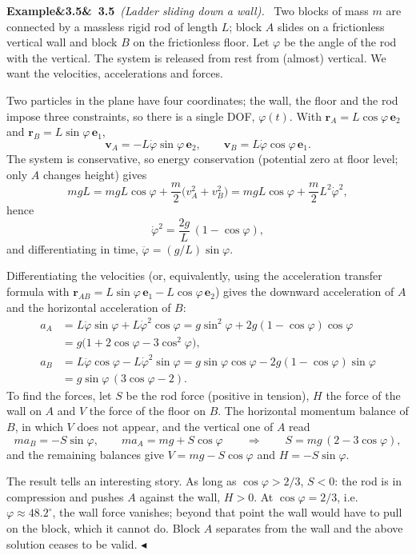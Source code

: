 \documentclass[11pt,a4paper,oneside]{report}
\numberwithin{equation}{chapter}
\newcommand{\vect}[1]{\bm{#1}}
\newcommand{\e}[1]{\vect{e}_{#1}}
\theoremstyle{plain}
\theoremstyle{definition}
\theoremstyle{remark}
\newenvironment{example}[2]{%
  \par\addvspace{\bigskipamount}\noindent
  \textbf{Example\ifx&#1&\else~#1\fi}\ \textit{(#2).}\ \ignorespaces}%
  {\hfill$\blacktriangleleft$\par\addvspace{\bigskipamount}}
\newcommand{\lecture}[2]{\marginpar{\raggedright\footnotesize\textsc{Lecture #1}\\\textit{#2}}}
\begin{document}
\lecture{9}{14.10.2026}
\begin{example}{3.5}{Ladder sliding down a wall}
Two blocks of mass $m$ are connected by a massless rigid rod of length $L$; block $A$ slides on a frictionless
vertical wall and block $B$ on the frictionless floor. Let $\varphi$ be the angle of the rod with the vertical. The system
is released from rest from (almost) vertical. We want the velocities, accelerations and forces.

Two particles in the plane have four coordinates; the wall, the floor and the rod impose three constraints, so there
is a single DOF, $\varphi(t)$. With $\vect r_A=L\cos\varphi\,\e2$ and $\vect r_B=L\sin\varphi\,\e1$,
\[
  \vect v_A=-L\dot\varphi\sin\varphi\,\e2,\qquad\vect v_B=L\dot\varphi\cos\varphi\,\e1 .
\]
The system is conservative, so energy conservation (potential zero at floor level; only $A$ changes height) gives
\[
  mgL=mgL\cos\varphi+\frac m2\big(v_A^2+v_B^2\big)=mgL\cos\varphi+\frac m2L^2\dot\varphi^2,
\]
hence
\[
  \dot\varphi^2=\frac{2g}{L}\,(1-\cos\varphi),
\]
and differentiating in time, $\ddot\varphi=(g/L)\sin\varphi$.

Differentiating the velocities (or, equivalently, using the acceleration transfer formula with
$\vect r_{AB}=L\sin\varphi\,\e1-L\cos\varphi\,\e2$) gives the downward acceleration of $A$ and the horizontal
acceleration of $B$:
\begin{align*}
  a_A&=L\ddot\varphi\sin\varphi+L\dot\varphi^2\cos\varphi=g\sin^2\varphi+2g(1-\cos\varphi)\cos\varphi\\
     &=g\big(1+2\cos\varphi-3\cos^2\varphi\big),\\
  a_B&=L\ddot\varphi\cos\varphi-L\dot\varphi^2\sin\varphi=g\sin\varphi\cos\varphi-2g(1-\cos\varphi)\sin\varphi\\
     &=g\sin\varphi\,(3\cos\varphi-2).
\end{align*}
To find the forces, let $S$ be the rod force (positive in tension), $H$ the force of the wall on $A$ and $V$ the force of the
floor on $B$. The horizontal momentum balance of $B$, in which $V$ does not appear, and the vertical one of $A$ read
\[
  ma_B=-S\sin\varphi,\qquad ma_A=mg+S\cos\varphi\qquad\Longrightarrow\qquad S=mg\,(2-3\cos\varphi),
\]
and the remaining balances give $V=mg-S\cos\varphi$ and $H=-S\sin\varphi$.

The result tells an interesting story. As long as $\cos\varphi>2/3$, $S<0$: the rod is in compression and pushes $A$
against the wall, $H>0$. At $\cos\varphi=2/3$, i.e.\ $\varphi\approx48.2^\circ$, the wall force vanishes; beyond
that point the wall would have to pull on the block, which it cannot do. Block $A$ separates from the wall and the
above solution ceases to be valid.
\end{example}
\end{document}
